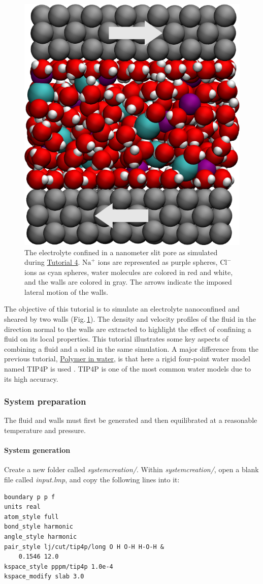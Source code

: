 \documentclass[9pt,tutorial]{livecoms}
\begin{document}
\begin{figure}
\centering
\includegraphics[width=0.55\linewidth]{NANOSHEAR}
\caption{The electrolyte confined in a nanometer slit pore as simulated during
\hyperref[sheared-confined-label]{Tutorial 4}. $\text{Na}^+$ ions are represented
as purple spheres, $\text{Cl}^-$ ions as cyan spheres, water molecules are colored
in red and white, and the walls are colored in gray. The arrows indicate the
imposed lateral motion of the walls.}
\label{fig:NANOSHEAR}
\end{figure}

\noindent The objective of this tutorial is to simulate an electrolyte
nanoconfined and sheared by two walls (Fig.\,\ref{fig:NANOSHEAR}). The density
and velocity profiles of the fluid in the direction normal to the walls are
extracted to highlight the effect of confining a fluid on its local properties.
This tutorial illustrates some key aspects of combining a fluid and a solid in
the same simulation. A major difference from the previous tutorial,
\hyperref[all-atoms-label]{Polymer in water}, is that here a rigid four-point
water model named TIP4P is used \cite{abascal2005general}. TIP4P is one of
the most common water models due to its high accuracy.

\subsubsection{System preparation}
The fluid and walls must first be generated and then equilibrated at a reasonable
temperature and pressure.

\paragraph{System generation}
Create a new folder called \textit{systemcreation/}. Within
\textit{systemcreation/}, open a blank file called \textit{input.lmp}, and
copy the following lines into it:
{\normalsize \begin{verbatim}
boundary p p f
units real
atom_style full
bond_style harmonic
angle_style harmonic
pair_style lj/cut/tip4p/long O H O-H H-O-H &
    0.1546 12.0
kspace_style pppm/tip4p 1.0e-4
kspace_modify slab 3.0
\end{verbatim}}
\end{document}
